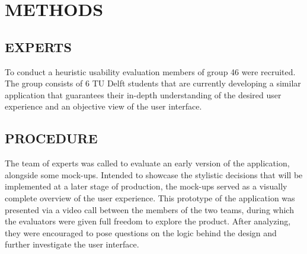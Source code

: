 \section{METHODS}

\subsection{EXPERTS}

To conduct a heuristic usability evaluation members of group 46 were recruited. The group consists of 6 TU Delft students that are currently developing a similar application that guarantees their in-depth understanding of the desired user experience and an objective view of the user interface.

\subsection{PROCEDURE}
The team of experts was called to evaluate an early version of the application, alongside some mock-ups. Intended to showcase the stylistic decisions that will be implemented at a later stage of production, the mock-ups served as a visually complete overview of the user experience. This prototype of the application was presented via a video call between the members of the two teams, during which the evaluators were given full freedom to explore the product. After analyzing, they were encouraged to pose questions on the logic behind the design and further investigate the user interface.

